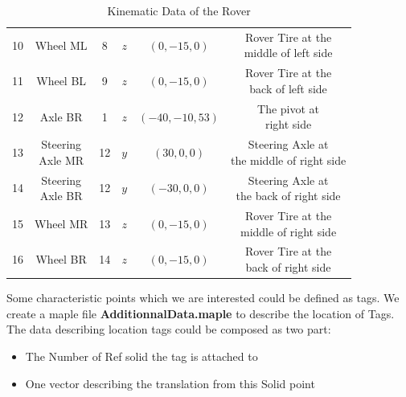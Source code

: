 \begin{table}[htbp]
\begin{center}
\begin{tabular}{lccccc}
  10&Wheel ML & 8 & $z$ & $(0,-15,0)$ & \tabincell{c}{Rover Tire at the\\middle of left side}\\
  11&Wheel BL & 9 & $z$ & $(0,-15,0)$ & \tabincell{c}{Rover Tire at the\\back of left side}\\
  12&Axle BR  & 1 &  $z$ & $(-40,-10,53)$ & \tabincell{c}{The pivot at\\ right side} \\
  13&\tabincell{c}{Steering\\ Axle MR} & 12 & $y$ & $(30,0,0)$ & \tabincell{c}{Steering Axle at\\the middle of right side}\\
  14&\tabincell{c}{Steering\\ Axle BR} & 12 & $y$ & $(-30,0,0)$ & \tabincell{c}{Steering Axle at\\the back of right side}\\
  15&Wheel MR & 13 & $z$ & $(0,-15,0)$ & \tabincell{c}{Rover Tire at the\\middle of right side}\\
  16&Wheel BR & 14 & $z$ & $(0,-15,0)$ & \tabincell{c}{Rover Tire at the\\back of right side}\\


  \bottomrule
 \end{tabular}
\caption{Kinematic Data of the Rover}
\end{center}
\end{table}


Some characteristic points which we are interested could be defined as tags. We create a maple file \textbf{AdditionnalData.maple} to describe the location of Tags. The data describing location tags could be composed as two part: 
\begin{itemize}
\item The Number of Ref solid the tag is attached to
\item One vector describing the translation from this Solid point
\end{itemize}

